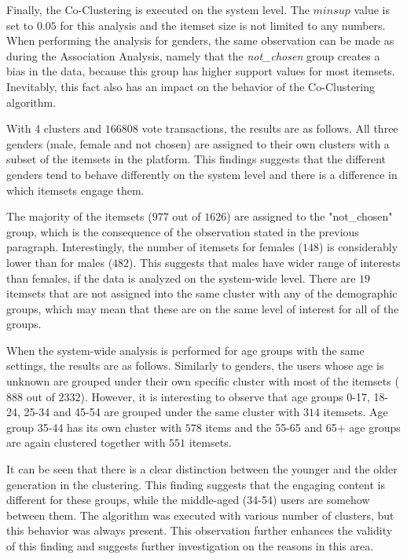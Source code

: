 Finally, the Co-Clustering is executed on the system level. The $minsup$ value is set to $0.05$ for this analysis and the itemset size is not limited to any numbers. When performing the analysis for genders, the same observation can be made as during the Association Analysis, namely that the \emph{not\_chosen} group creates a bias in the data, because this group has higher support values for most itemsets. Inevitably, this fact also has an impact on the behavior of the Co-Clustering algorithm. 

With 4 clusters and $166 808$ vote transactions, the results are as follows. All three genders (male, female and not chosen) are assigned to their own clusters with a subset of the itemsets in the platform. This findings suggests that the different genders tend to behave differently on the system level and there is a difference in which itemsets engage them. 

The majority of the itemsets ($977$ out of $1 626$) are assigned to the "not\_chosen" group, which is the consequence of the observation stated in the previous paragraph. Interestingly, the number of itemsets for females ($148$) is considerably lower than for males ($482$). This suggests that males have wider range of interests than females, if the data is analyzed on the system-wide level. There are $19$ itemsets that are not assigned into the same cluster with any of the demographic groups, which may mean that these are on the same level of interest for all of the groups. 

When the system-wide analysis is performed for age groups with the same settings, the results are as follows. Similarly to genders, the users whose age is unknown are grouped under their own specific cluster with most of the itemsets ($888$ out of $2 332$). However, it is interesting to observe that age groups 0-17, 18-24, 25-34 and 45-54 are grouped under the same cluster with $314$ itemsets. Age group 35-44 has its own cluster with $578$ items and the 55-65 and 65+ age groups are again clustered together with $551$ itemsets. 

It can be seen that there is a clear distinction between the younger and the older generation in the clustering. This finding suggests that the engaging content is different for these groups, while the middle-aged (34-54) users are somehow between them. The algorithm was executed with various number of clusters, but this behavior was always present. This observation further enhances the validity of this finding and suggests further investigation on the reasons in this area.


